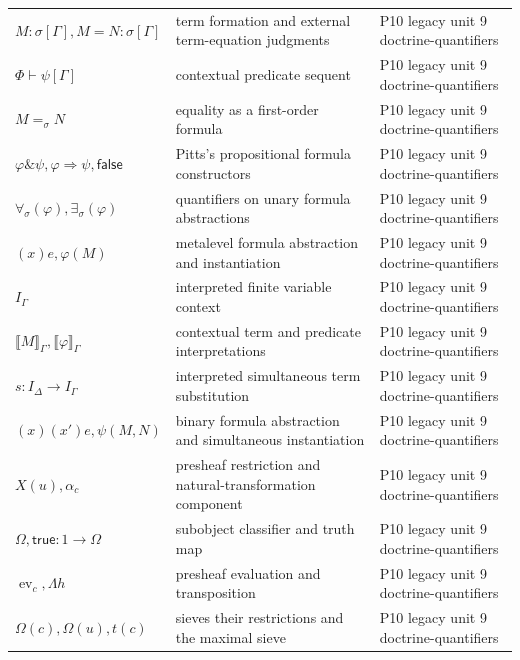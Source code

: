 \begin{longtable}{@{}p{}p{}p{}@{}}
\(M:\sigma[\Gamma],\allowbreak M=N:\sigma[\Gamma]\) & term formation and external term-equation judgments & P10 legacy unit 9 doctrine-\allowbreak{}quantifiers \\
\(\Phi\vdash\psi[\Gamma]\) & contextual predicate sequent & P10 legacy unit 9 doctrine-\allowbreak{}quantifiers \\
\(M=_\sigma N\) & equality as a first-order formula & P10 legacy unit 9 doctrine-\allowbreak{}quantifiers \\
\(\varphi\mathbin{\&}\psi,\allowbreak \varphi\Rightarrow\psi,\allowbreak \mathsf{false}\) & Pitts's propositional formula constructors & P10 legacy unit 9 doctrine-\allowbreak{}quantifiers \\
\(\forall_\sigma(\varphi),\allowbreak \exists_\sigma(\varphi)\) & quantifiers on unary formula abstractions & P10 legacy unit 9 doctrine-\allowbreak{}quantifiers \\
\((x)e,\allowbreak \varphi(M)\) & metalevel formula abstraction and instantiation & P10 legacy unit 9 doctrine-\allowbreak{}quantifiers \\
\(I_\Gamma\) & interpreted finite variable context & P10 legacy unit 9 doctrine-\allowbreak{}quantifiers \\
\(\llbracket M\rrbracket_\Gamma,\allowbreak \llbracket\varphi\rrbracket_\Gamma\) & contextual term and predicate interpretations & P10 legacy unit 9 doctrine-\allowbreak{}quantifiers \\
\(s:I_\Delta\to I_\Gamma\) & interpreted simultaneous term substitution & P10 legacy unit 9 doctrine-\allowbreak{}quantifiers \\
\((x)(x')e,\allowbreak \psi(M,\allowbreak N)\) & binary formula abstraction and simultaneous instantiation & P10 legacy unit 9 doctrine-\allowbreak{}quantifiers \\
\(X(u),\allowbreak \alpha_c\) & presheaf restriction and natural-transformation component & P10 legacy unit 9 doctrine-\allowbreak{}quantifiers \\
\(\Omega,\allowbreak \mathsf{true}:1\to\Omega\) & subobject classifier and truth map & P10 legacy unit 9 doctrine-\allowbreak{}quantifiers \\
\(\operatorname{ev}_c,\allowbreak \Lambda h\) & presheaf evaluation and transposition & P10 legacy unit 9 doctrine-\allowbreak{}quantifiers \\
\(\Omega(c),\allowbreak \Omega(u),\allowbreak t(c)\) & sieves their restrictions and the maximal sieve & P10 legacy unit 9 doctrine-\allowbreak{}quantifiers \\

\end{longtable}
